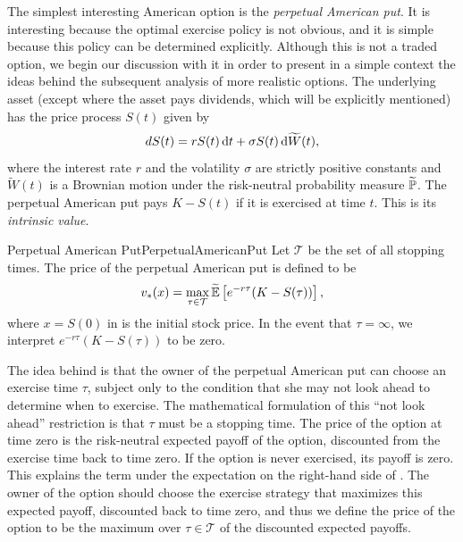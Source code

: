 The simplest interesting American option is the \textit{perpetual American put}. It is interesting because the optimal exercise policy is not obvious, and it is simple because this policy can be determined explicitly. Although this is not a traded option, we begin our discussion with it in order to present in a simple context the ideas behind the subsequent analysis of more realistic options.
The underlying asset (except where the asset pays dividends, which will be explicitly mentioned) has the price process \(S(t)\) given by
\begin{equation}
	\label{eq:GBMRiskNeutral}
	dS(t) = rS(t) \, \mathrm{d} t + \sigma S(t) \, \mathrm{d} \widetilde{W}(t),
\end{equation}
where the interest rate \(r\) and the volatility \(\sigma\) are strictly positive constants and \(\widetilde{W}(t)\) is a Brownian motion under the risk-neutral probability measure \(\widetilde{\mathbb{P}}\). The perpetual American put pays \(K - S(t)\) if it is exercised at time \(t\). This is its \textit{intrinsic value}.

\begin{defn}{Perpetual American Put}{PerpetualAmericanPut}
	Let \(\mathcal{T}\) be the set of all stopping times. The price of the perpetual American put is defined to be
	\begin{equation}
		\label{eq:PerpetualAmericanPutPrice}
		v_*(x) = \max_{\tau \in \mathcal{T}} \widetilde{\mathbb{E}} \left[ e^{-r\tau} (K - S(\tau)) \right],
	\end{equation}
	where \(x = S(0)\) in  is the initial stock price. In the event that \(\tau = \infty\), we interpret \(e^{-r\tau}(K - S(\tau))\) to be zero.
\end{defn}

The idea behind  is that the owner of the perpetual American put can choose an exercise time \(\tau\), subject only to the condition that she may not look ahead to determine when to exercise. The mathematical formulation of this ``not look ahead'' restriction is that \(\tau\) must be a stopping time. The price of the option at time zero is the risk-neutral expected payoff of the option, discounted from the exercise time back to time zero. If the option is never exercised, its payoff is zero. This explains the term under the expectation on the right-hand side of . The owner of the option should choose the exercise strategy that maximizes this expected payoff, discounted back to time zero, and thus we define the price of the option to be the maximum over \(\tau \in \mathcal{T}\) of the discounted expected payoffs.

